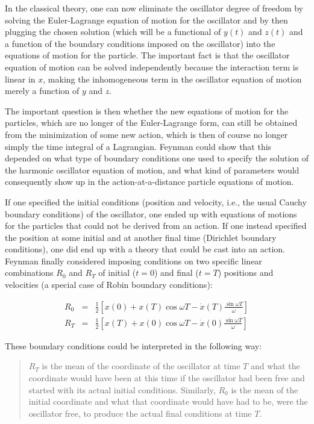 \documentclass[12pt,a4paper]{article}
\begin{document}
In the classical theory, one can now eliminate the oscillator degree of freedom by solving the Euler-Lagrange equation of motion for the oscillator and by then plugging the chosen solution (which will be a functional of $y(t)$ and $z(t)$ and a function of the boundary conditions imposed on the oscillator) into the equations of motion for the particle. The important fact is that the oscillator equation of motion can be solved independently because the interaction term is linear in $x$, making the inhomogeneous term in the oscillator equation of motion merely a function of $y$ and $z$.

The important question is then whether the new equations of motion for the particles, which are no longer of the Euler-Lagrange form, can still be obtained from the minimization of some new action, which is then of course no longer simply the time integral of a Lagrangian. Feynman could show that this depended on what type of boundary conditions one used to specify the solution of the harmonic oscillator equation of motion, and what kind of parameters would consequently show up in the action-at-a-distance particle equations of motion.

If one specified the initial conditions (position and velocity, i.e., the usual Cauchy boundary conditions) of the oscillator, one ended up with equations of motions for the particles that could not be derived from an action. If one instead specified the position at some initial and at another final time (Dirichlet boundary conditions), one did end up with a theory that could be cast into an action. Feynman finally considered imposing conditions on two specific linear combinations $R_0$ and $R_T$ of initial ($t=0$) and final ($t=T$) positions and velocities (a special case of Robin boundary conditions):

\begin{eqnarray}
R_0 & = & \frac{1}{2} \left[ x(0) + x(T) \cos{\omega T} - \dot{x} (T) \frac{\sin{\omega T}}{\omega} \right] \nonumber\\
R_T & = & \frac{1}{2} \left[ x(T) + x(0) \cos{\omega T} - \dot{x} (0) \frac{\sin{\omega T}}{\omega} \right]
\end{eqnarray} 

These boundary conditions could be interpreted in the following way:

\begin{quote}
$R_T$ is the mean of the coordinate of the oscillator at time $T$ and what the coordinate would have been at this time if the oscillator had been free and started with its actual initial conditions. Similarly, $R_0$ is the mean of the initial coordinate and what that coordinate would have had to be, were the oscillator free, to produce the actual final conditions at time $T$.
\end{quote}
\end{document}
